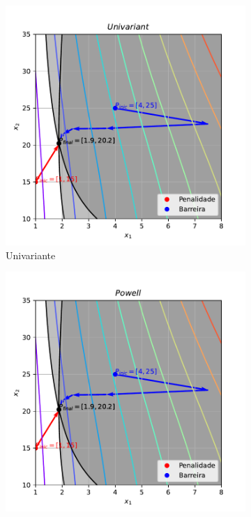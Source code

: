 \documentclass[10pt, a4paper]{article}
\begin{document}
\begin{figure}[htpb]
  \centering
  \begin{subfigure}[b]{0.32\textwidth}
      \centering
      \includegraphics[width=\textwidth]{images/q2_Univariant.pdf}
      \caption{Univariante}
      \label{fig:q2_univariant}
  \end{subfigure}
  \hfill
  \begin{subfigure}[b]{0.32\textwidth}
    \centering
    \includegraphics[width=\textwidth]{images/q2_Powell.pdf}

\end{subfigure}
\end{figure}
\end{document}
